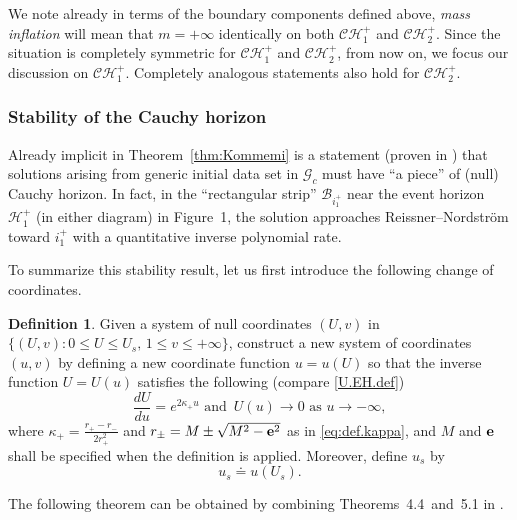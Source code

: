 \documentclass[10pt, reqno]{amsart}
\theoremstyle{definition}
\newtheorem{definition}[theorem]{Definition}
\theoremstyle{remark}
\numberwithin{equation}{section}
\newcommand{\0}{\emptyset}
\newcommand{\kpp}{\kappa}
\newcommand{\bfe}{{\bf e}}
\newcommand{\calC}{\mathcal C}
\newcommand{\calH}{\mathcal H}
\newcommand{\f}{\frac}
\newcommand{\CH}{\calC \calH^{+}}		%
\newcommand{\EH}{\calH^{+}}
\begin{document}
We note already in terms of the boundary components defined above, \emph{mass inflation} will mean that $m=+\infty$ identically on both $\CH_1$ and $\CH_2$. Since the situation is completely symmetric for $\CH_1$ and $\CH_2$, from now on, we focus our discussion on $\CH_1$. Completely analogous statements also hold for $\CH_2$.


\subsubsection{Stability of the Cauchy horizon} Already implicit in Theorem~\ref{thm:Kommemi} is a statement (proven in \cite{D2}) that solutions arising from generic initial data set in $\mathcal G_c$ must have ``a piece'' of (null) Cauchy horizon. In fact, in the ``rectangular strip'' $\mathscr B_{i^+_1}$ near the event horizon $\EH_1$ (in either diagram) in Figure~1, the solution approaches Reissner--Nordstr\"om toward $i_1^+$ with a quantitative inverse polynomial rate. 

To summarize this stability result, let us first introduce the following change of coordinates.
\begin{definition}\label{def:u.v.system.from.U.v}
Given a system of null coordinates $(U,v)$ in $\{(U,v): 0\leq U\leq U_s,\, 1\leq v\leq +\infty\}$, construct a new system of coordinates $(u,v)$ by defining a new coordinate function $u = u(U)$ so that the inverse function $U = U(u)$ satisfies the following (compare \eqref{U.EH.def})
\begin{equation}\label{U.EH.def.nonlinear}
\f{dU}{du}=e^{2\kappa_+ u} \mbox{ and }\, U(u)\to 0 \mbox{ as }u\to -\infty,
\end{equation}
where $\kpp_{+} = \frac{r_{+}-r_{-}}{2 r_{+}^{2}}$ and $r_{\pm} = M \pm \sqrt{M^{2}-\bfe^{2}}$ as in \eqref{eq:def.kappa}, and $M$ and $\bfe$ shall be specified when the definition is applied.
Moreover, define $u_s$ by
\begin{equation}\label{eq:def.us}
u_s \doteq u(U_s).
\end{equation}
\end{definition}

The following theorem can be obtained by combining Theorems~4.4~and~5.1 in \cite{LO.interior}.
\end{document}
